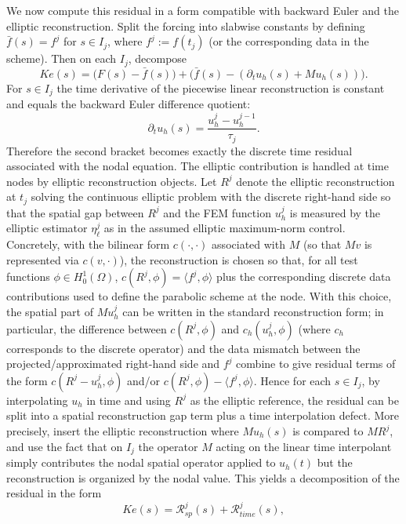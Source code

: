 \documentclass{article}
\begin{document}
We now compute this residual in a form compatible with backward Euler and the elliptic reconstruction. Split the forcing into slabwise constants by defining $\bar f(s)=f^j$ for $s\in I_j$, where $f^j:=f(t_j)$ (or the corresponding data in the scheme). Then on each $I_j$, decompose
\[
K e(s)=\big( F(s)-\bar f(s)\big)+\big(\bar f(s)-(\partial_t u_h(s)+M u_h(s))\big).
\]
For $s\in I_j$ the time derivative of the piecewise linear reconstruction is constant and equals the backward Euler difference quotient:
\[
\partial_t u_h(s)=\frac{u_h^j-u_h^{j-1}}{\tau_j}.
\]
Therefore the second bracket becomes exactly the discrete time residual associated with the nodal equation. The elliptic contribution is handled at time nodes by elliptic reconstruction objects. Let $R^j$ denote the elliptic reconstruction at $t_j$ solving the continuous elliptic problem with the discrete right-hand side so that the spatial gap between $R^j$ and the FEM function $u_h^j$ is measured by the elliptic estimator $\eta_{\ell}^j$ as in the assumed elliptic maximum-norm control. Concretely, with the bilinear form $c(\cdot,\cdot)$ associated with $M$ (so that $Mv$ is represented via $c(v,\cdot)$), the reconstruction is chosen so that, for all test functions $\phi\in H^1_0(\Omega)$, $c(R^j,\phi)=\langle f^j,\phi\rangle$ plus the corresponding discrete data contributions used to define the parabolic scheme at the node. With this choice, the spatial part of $M u_h^j$ can be written in the standard reconstruction form; in particular, the difference between $c(R^j,\phi)$ and $c_h(u_h^j,\phi)$ (where $c_h$ corresponds to the discrete operator) and the data mismatch between the projected/approximated right-hand side and $f^j$ combine to give residual terms of the form $c(R^j-u_h^j,\phi)$ and/or $c(R^j,\phi)-\langle f^j,\phi\rangle$. Hence for each $s\in I_j$, by interpolating $u_h$ in time and using $R^j$ as the elliptic reference, the residual can be split into a spatial reconstruction gap term plus a time interpolation defect. More precisely, insert the elliptic reconstruction where $M u_h(s)$ is compared to $M R^j$, and use the fact that on $I_j$ the operator $M$ acting on the linear time interpolant simply contributes the nodal spatial operator applied to $u_h(t)$ but the reconstruction is organized by the nodal value. This yields a decomposition of the residual in the form
\[
K e(s)=\mathcal R_{sp}^j(s)+\mathcal R_{time}^j(s),
\]
\end{document}

